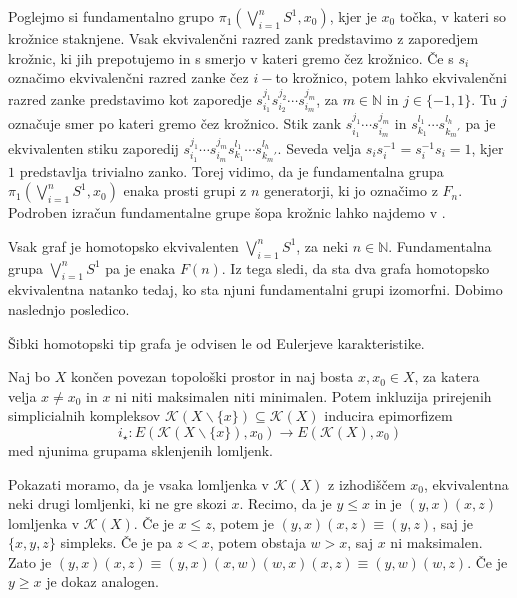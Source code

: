 \documentclass[mat1]{fmfdelo}
\newcommand{\N}{\mathbb N}
\begin{document}
Poglejmo si  fundamentalno grupo  $\pi_1(\bigvee\limits_{i=1}^{n}S^1,x_0)$, kjer je $x_0$ točka, v kateri so krožnice 
staknjene. Vsak ekvivalenčni razred zank predstavimo z zaporedjem krožnic, ki jih prepotujemo in s 
smerjo v kateri gremo čez krožnico. Če s $s_i$ označimo ekvivalenčni razred zanke čez $i-$to krožnico, potem lahko ekvivalenčni razred
zanke  predstavimo kot zaporedje $s_{i_1}^{j_1}s_{i_2}^{j_2}\cdots s_{i_m}^{j_m}$, za $m\in \N$ in 
$j\in \{-1,1\}.$ Tu $j$ označuje smer po kateri gremo čez krožnico. Stik zank 
$s_{i_1}^{j_1}\cdots s_{i_m}^{j_m}$ in $s_{k_1}^{l_1}\cdots s_{k_m'}^{l_h}$ pa je ekvivalenten 
stiku zaporedij $s_{i_1}^{j_1}\cdots s_{i_m}^{j_m}s_{k_1}^{l_1}\cdots s_{k_m'}^{l_h}$.
Seveda velja $s_i s_i^{-1}=s_i^{-1}s_i=1$, kjer $1$ predstavlja trivialno zanko. 
Torej vidimo, da je fundamentalna grupa $\pi_1(\bigvee\limits_{i=1}^{n}S^1,x_0)$ enaka prosti grupi z $n$
generatorji, ki jo označimo z $F_n$. Podroben izračun fundamentalne grupe šopa krožnic lahko najdemo v \cite[razdelek 1.1]{hatcher}.


Vsak graf je homotopsko ekvivalenten $\bigvee\limits_{i=1}^{n}S^1$, za neki $n\in \N$. Fundamentalna grupa $\bigvee\limits_{i=1}^{n}S^1$ pa je enaka $F(n)$. Iz tega sledi, da sta dva grafa homotopsko ekvivalentna natanko tedaj, ko sta njuni fundamentalni grupi izomorfni. Dobimo naslednjo posledico.

\begin{posledica}
    Šibki homotopski tip grafa je odvisen le od Eulerjeve karakteristike.
    \label{pos:karakteristika}
\end{posledica}


\begin{trditev}
    Naj bo $X$ končen povezan topološki prostor in naj bosta $x,x_0\in X$, za katera velja $x\neq x_0$ in $x$ ni niti maksimalen niti minimalen. Potem inkluzija prirejenih simplicialnih kompleksov $\mathcal{K}(X\backslash\{x\})\subseteq \mathcal{K}(X)$ inducira epimorfizem 
    $$
i_\star\colon E(\mathcal{K}(X\backslash\{x\}),x_0)\rightarrow E(\mathcal{K}(X),x_0)
    $$
    med njunima grupama sklenjenih lomljenk.
\end{trditev}

\begin{dokaz}
    Pokazati moramo, da je vsaka lomljenka v $\mathcal{K}(X)$ z izhodiščem $x_0$, ekvivalentna neki drugi lomljenki, ki ne gre skozi $x$.
    Recimo, da je $y\leq x$ in je $(y,x)(x,z)$ lomljenka v $\mathcal{K}(X)$. Če je $x\leq z$, potem je $(y,x)(x,z)\equiv(y,z)$, saj je $\{x,y,z\}$ simpleks. Če je pa $z< x$, potem obstaja $w>x$, saj $x$ ni maksimalen. Zato je $(y,x)(x,z)\equiv(y,x)(x,w)(w,x)(x,z)\equiv (y,w)(w,z)$. Če je $y\geq x$ je dokaz analogen.
\end{dokaz}
\end{document}
